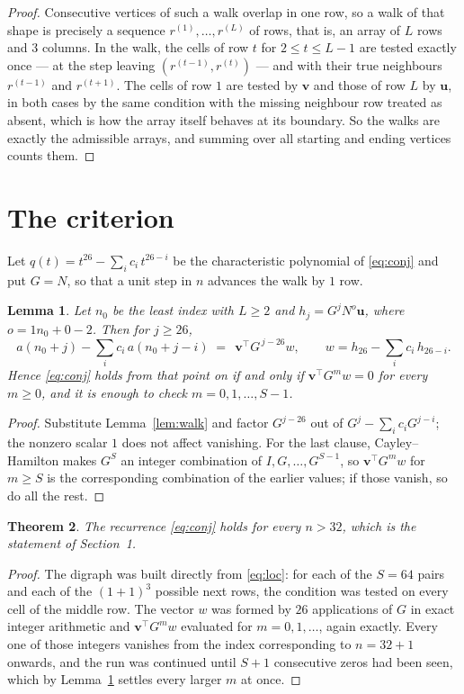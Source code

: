 \documentclass[11pt,a4paper]{article}
\theoremstyle{plain}
\newtheorem{theorem}{Theorem}
\newtheorem{lemma}[theorem]{Lemma}
\theoremstyle{definition}
\begin{document}
\begin{proof}
Consecutive vertices of such a walk overlap in one row, so a walk of that shape is
precisely a sequence $r^{(1)},\dots,r^{(L)}$ of rows, that is, an array of $L$ rows
and $3$ columns. In the walk, the cells of row $t$ for $2\le t\le L-1$ are tested
exactly once --- at the step leaving $(r^{(t-1)},r^{(t)})$ --- and with their true
neighbours $r^{(t-1)}$ and $r^{(t+1)}$. The cells of row $1$ are tested by
$\mathbf{v}$ and those of row $L$ by $\mathbf{u}$, in both cases by the same condition
with the missing neighbour row treated as absent, which is how the array itself behaves at
its boundary. So the walks are exactly the admissible arrays, and summing over all starting
and ending vertices counts them.
\end{proof}

\section{The criterion}

Let $q(t)=t^{26}-\sum_i c_i\,t^{26-i}$ be the characteristic polynomial of
\eqref{eq:conj} and put $G=N$, so that a unit step in $n$ advances the walk by
$1$ row.

\begin{lemma}\label{lem:crit}
Let $n_0$ be the least index with $L\ge2$ and $h_j=G^{j}N^{o}\mathbf{u}$, where
$o=1n_0+0-2$. Then for $j\ge26$,
\[
a(n_0+j)-\sum_i c_i\,a(n_0+j-i)\;=\;\,\mathbf{v}^{\!\top}G^{\,j-26}w,
\qquad w=h_{26}-\sum_i c_i\,h_{26-i} .
\]
Hence \eqref{eq:conj} holds from that point on if and only if
$\mathbf{v}^{\!\top}G^{m}w=0$ for every $m\ge0$, and it is enough to check
$m=0,1,\dots,S-1$.
\end{lemma}

\begin{proof}
Substitute Lemma~\ref{lem:walk} and factor $G^{j-26}$ out of
$G^{j}-\sum_ic_iG^{j-i}$; the nonzero scalar $1$ does not affect
vanishing. For the last clause, Cayley--Hamilton makes $G^{S}$ an integer combination of
$I,G,\dots,G^{S-1}$, so $\mathbf{v}^{\!\top}G^{m}w$ for $m\ge S$ is the corresponding
combination of the earlier values; if those vanish, so do all the rest.
\end{proof}

\begin{theorem}
The recurrence \eqref{eq:conj} holds for every $n>32$, which is the statement of
Section~1.
\end{theorem}

\begin{proof}
The digraph was built directly from \eqref{eq:loc}: for each of the $S=64$ pairs and each
of the $(1+1)^{3}$ possible next rows, the condition was tested on every cell of
the middle row. The vector $w$ was formed by $26$ applications of $G$ in exact integer
arithmetic and $\mathbf{v}^{\!\top}G^{m}w$ evaluated for $m=0,1,\dots$, again exactly.
Every one of those integers vanishes from the index corresponding to $n=32+1$ onwards,
and the run was continued until $S+1$ consecutive zeros had been seen, which by
Lemma~\ref{lem:crit} settles every larger $m$ at once.
\end{proof}
\end{document}

